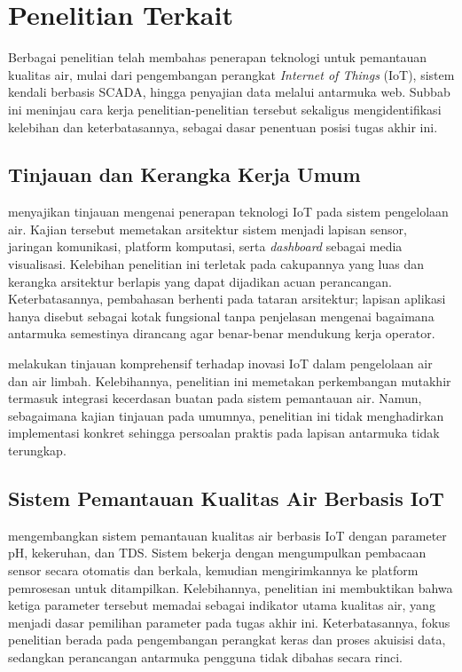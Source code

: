 \section{Penelitian Terkait}

Berbagai penelitian telah membahas penerapan teknologi untuk pemantauan kualitas air, mulai dari pengembangan
perangkat \textit{Internet of Things} (IoT), sistem kendali berbasis SCADA, hingga penyajian data melalui
antarmuka web. Subbab ini meninjau cara kerja penelitian-penelitian tersebut sekaligus mengidentifikasi kelebihan
dan keterbatasannya, sebagai dasar penentuan posisi tugas akhir ini.

\subsection{Tinjauan dan Kerangka Kerja Umum}
\textcite{ismail2022iot} menyajikan tinjauan mengenai penerapan teknologi IoT pada sistem pengelolaan air. Kajian
tersebut memetakan arsitektur sistem menjadi lapisan sensor, jaringan komunikasi, platform komputasi, serta
\textit{dashboard} sebagai media visualisasi. Kelebihan penelitian ini terletak pada cakupannya yang luas dan
kerangka arsitektur berlapis yang dapat dijadikan acuan perancangan. Keterbatasannya, pembahasan berhenti pada
tataran arsitektur; lapisan aplikasi hanya disebut sebagai kotak fungsional tanpa penjelasan mengenai bagaimana
antarmuka semestinya dirancang agar benar-benar mendukung kerja operator.

\textcite{alshami2024iot} melakukan tinjauan komprehensif terhadap inovasi IoT dalam pengelolaan air dan air
limbah. Kelebihannya, penelitian ini memetakan perkembangan mutakhir termasuk integrasi kecerdasan buatan pada
sistem pemantauan air. Namun, sebagaimana kajian tinjauan pada umumnya, penelitian ini tidak menghadirkan
implementasi konkret sehingga persoalan praktis pada lapisan antarmuka tidak terungkap.

\subsection{Sistem Pemantauan Kualitas Air Berbasis IoT}
\textcite{kumar2024iot} mengembangkan sistem pemantauan kualitas air berbasis IoT dengan parameter pH, kekeruhan,
dan TDS. Sistem bekerja dengan mengumpulkan pembacaan sensor secara otomatis dan berkala, kemudian mengirimkannya
ke platform pemrosesan untuk ditampilkan. Kelebihannya, penelitian ini membuktikan bahwa ketiga parameter tersebut
memadai sebagai indikator utama kualitas air, yang menjadi dasar pemilihan parameter pada tugas akhir ini.
Keterbatasannya, fokus penelitian berada pada pengembangan perangkat keras dan proses akuisisi data, sedangkan
perancangan antarmuka pengguna tidak dibahas secara rinci.

